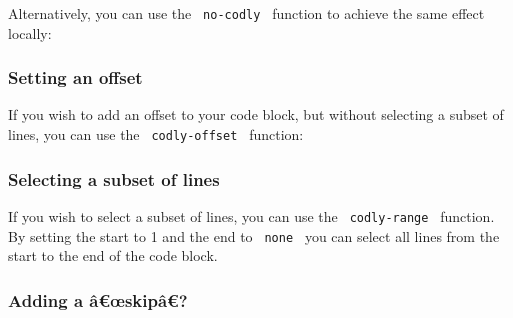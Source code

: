 \begin{Shaded}
\begin{Highlighting}[]
\end{Highlighting}
\end{Shaded}

Alternatively, you can use the \texttt{\ no-codly\ } function to achieve
the same effect locally:

\begin{Shaded}
\begin{Highlighting}[]
\NormalTok{\#no{-}codly[}
\NormalTok{  \textasciigrave{}\textasciigrave{}\textasciigrave{}}
\NormalTok{]}
\end{Highlighting}
\end{Shaded}

\subsubsection{Setting an offset}\label{setting-an-offset}

If you wish to add an offset to your code block, but without selecting a
subset of lines, you can use the \texttt{\ codly-offset\ } function:

\begin{Shaded}
\begin{Highlighting}[]
\end{Highlighting}
\end{Shaded}

\subsubsection{Selecting a subset of
lines}\label{selecting-a-subset-of-lines}

If you wish to select a subset of lines, you can use the
\texttt{\ codly-range\ } function. By setting the start to 1 and the end
to \texttt{\ none\ } you can select all lines from the start to the end
of the code block.

\begin{Shaded}
\begin{Highlighting}[]
\end{Highlighting}
\end{Shaded}

\subsubsection{Adding a â€œskipâ€?}\label{adding-a-uxe2ux153skipuxe2}

